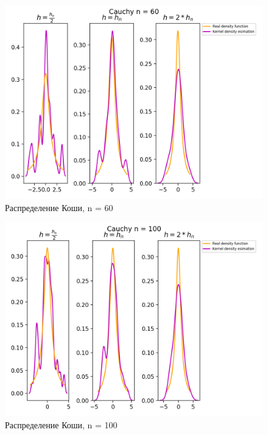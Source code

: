 \begin{figure}[H]
	\begin{center}
		\includegraphics[scale=0.7]{fig/Cauchy60_kde.png}
		\caption{Распределение Коши, n = 60} 
		\label{pic:pic_name}
	\end{center}
\end{figure}

\begin{figure}[H]
	\begin{center}
		\includegraphics[scale=0.7]{fig/Cauchy100_kde.png}
		\caption{Распределение Коши, n = 100} 
		\label{pic:pic_name}
	\end{center}
\end{figure}

